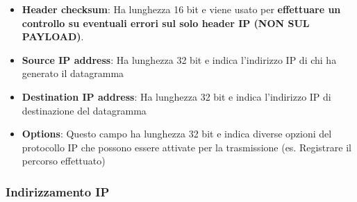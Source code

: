 \documentclass[12pt]{article}
\begin{document}
\begin{itemize}
    \item \textbf{Header checksum}: Ha lunghezza 16 bit e viene usato per \textbf{effettuare un controllo su eventuali errori sul solo header IP (NON SUL PAYLOAD)}.
    \item \textbf{Source IP address}: Ha lunghezza 32 bit e indica l'indirizzo IP di chi ha generato il datagramma
    \item \textbf{Destination IP address}: Ha lunghezza 32 bit e indica l'indirizzo IP di destinazione del datagramma
    \item \textbf{Options}: Questo campo ha lunghezza 32 bit e indica diverse opzioni del protocollo IP che possono essere attivate per la trasmissione (es. Registrare il percorso effettuato)
\end{itemize}

\subsubsection{Indirizzamento IP}
\end{document}
